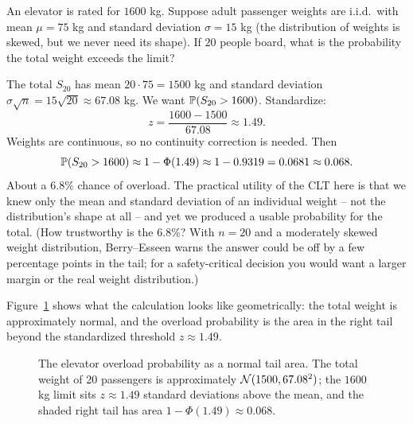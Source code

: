 \begin{example}
\label{ch21:ex-elevator}
An elevator is rated for $1600$ kg. Suppose adult passenger weights are i.i.d.\ with
mean $\mu = 75$ kg and standard deviation $\sigma = 15$ kg (the distribution of weights
is skewed, but we never need its shape). If $20$ people board, what is the probability
the total weight exceeds the limit?

The total $S_{20}$ has mean $20 \cdot 75 = 1500$ kg and standard deviation
$\sigma\sqrt{n} = 15\sqrt{20} \approx 67.08$ kg. We want $\P(S_{20} > 1600)$.
Standardize:
\[
  z = \frac{1600 - 1500}{67.08} \approx 1.49.
\]
Weights are continuous, so no continuity correction is needed. Then
\[
  \P(S_{20} > 1600) \approx 1 - \Phi(1.49) \approx 1 - 0.9319 = 0.0681 \approx 0.068.
\]
About a $6.8\%$ chance of overload. The practical utility of the CLT here is that we knew only
the mean and standard deviation of an individual weight -- not the distribution's shape
at all -- and yet we produced a usable probability for the total. (How trustworthy is the $6.8\%$? With $n=20$ and a
moderately skewed weight distribution, Berry--Esseen warns the answer could be off by a
few percentage points in the tail; for a safety-critical decision you would want a
larger margin or the real weight distribution.)
\end{example}

Figure~\ref{ch21:fig-tail} shows what the calculation looks like geometrically: the
total weight is approximately normal, and the overload probability is the area in the
right tail beyond the standardized threshold $z \approx 1.49$.

\begin{figure}[H]
\centering
{}
\caption{The elevator overload probability as a normal tail area. The total weight of
20 passengers is approximately $\Normal(1500, 67.08^2)$; the $1600$ kg limit sits
$z \approx 1.49$ standard deviations above the mean, and the shaded right tail has area
$1 - \Phi(1.49) \approx 0.068$.}
\label{ch21:fig-tail}
\end{figure}

